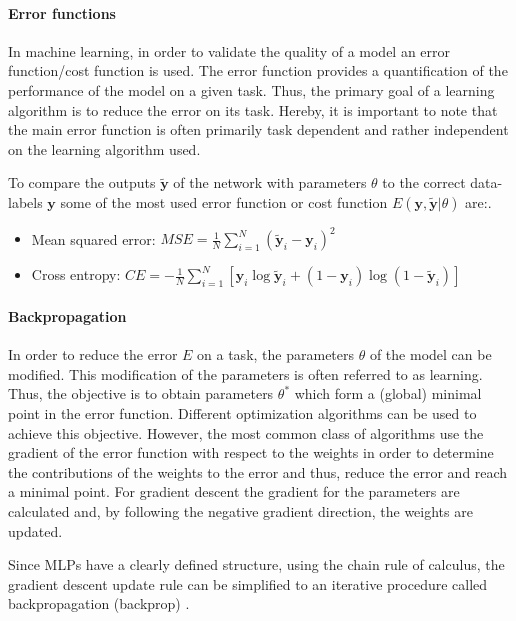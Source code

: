 \paragraph{Error functions} \label{c:mlperr}

In machine learning, in order to validate the quality of a model an error function/cost function is used.
The error function provides a quantification of the performance of the model on a given task.
Thus, the primary goal of a learning algorithm is to reduce the error on its task.
Hereby, it is important to note that the main error function is often primarily task dependent and rather independent on the learning algorithm used.  

To compare the outputs $\tilde{\textbf{y}}$ of the network with parameters $\theta$ to the correct data-labels $\textbf{y}$ some of the most used error function or cost function $E(\textbf{y},\tilde{\textbf{y}} | \theta)$ are:.

\begin{itemize}
	\item Mean squared error: $MSE = \frac{1}{N} \sum_{i=1}^N (\tilde{\textbf{y}}_i - \textbf{y}_i)^2 $
	\item Cross entropy: $CE = - \frac{1}{N} \sum_{i=1}^N [ \textbf{y}_i \log \tilde{\textbf{y}}_i + (1 - \textbf{y}_i) \log (1 - \tilde{\textbf{y}}_i)]$
\end{itemize}

\paragraph{Backpropagation} \label{c:backprop}

In order to reduce the error $E$ on a task, the parameters $\theta$ of the model can be modified.
This modification of the parameters is often referred to as learning.
Thus, the objective is to obtain parameters $\theta^*$ which form a (global) minimal point in the error function. 
Different optimization algorithms can be used to achieve this objective.
However, the most common class of algorithms use the gradient of the error function with respect to the weights in order to determine the contributions of the weights to the error and thus, reduce the error and reach a minimal point.
For gradient descent the gradient for the parameters are calculated and, by following the negative gradient direction, the weights are updated.

Since MLPs have a clearly defined structure, using the chain rule of calculus, the gradient descent update rule can be simplified to an iterative procedure called backpropagation (backprop)  \cite{rumelhart1985learning}\cite{Goodfellow-et-al-2016-Book}.

